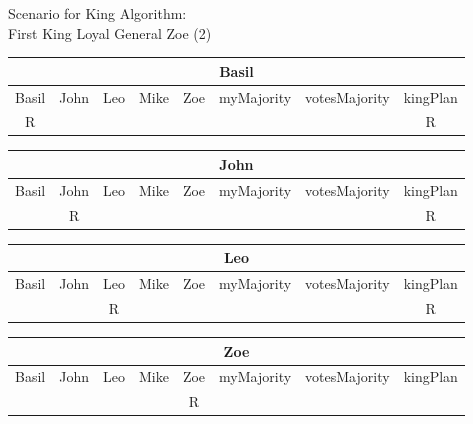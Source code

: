 \begin{wideslide}[bm=,toc=]{\large Scenario for King Algorithm:\\First King Loyal General Zoe (2)}
\vspace*{2ex}
\begin{center}
\begin{paenv}

\begin{tabular}{|c|c|c|c|c||c|c|c|}
\hline
\multicolumn{8}{|c|}{Basil}\\\hline
Basil & John & Leo & Mike & Zoe & myMajority & votesMajority & kingPlan \\\hline
R&&&&&&&R\\\hline
\end{tabular}
\smallskip

\begin{tabular}{|c|c|c|c|c||c|c|c|}
\hline
\multicolumn{8}{|c|}{John}\\\hline
Basil & John & Leo & Mike & Zoe & myMajority & votesMajority & kingPlan \\\hline
&R&&&&&&R\\\hline
\end{tabular}
\smallskip

\begin{tabular}{|c|c|c|c|c||c|c|c|}
\hline
\multicolumn{8}{|c|}{Leo}\\\hline
Basil & John & Leo & Mike & Zoe & myMajority & votesMajority & kingPlan \\\hline
&&R&&&&&R\\\hline
\end{tabular}
\smallskip

\begin{tabular}{|c|c|c|c|c||c|c|c|}
\hline
\multicolumn{8}{|c|}{Zoe}\\\hline
Basil & John & Leo & Mike & Zoe & myMajority & votesMajority & kingPlan \\\hline
&&&&R&&&\\\hline
\end{tabular}
\end{paenv}
\end{center}
\end{wideslide}


